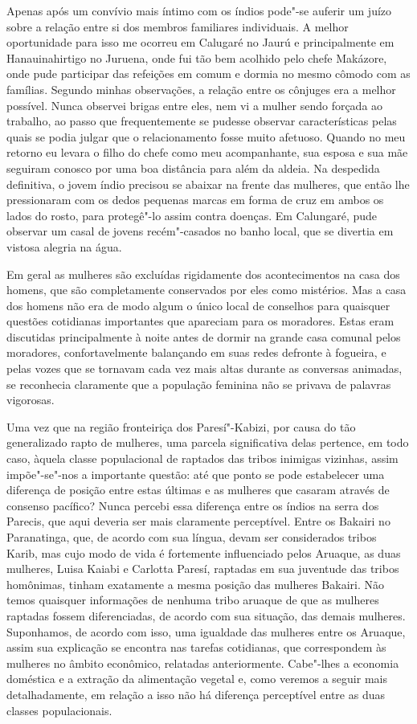 {Apenas após um convívio mais íntimo com os índios pode"-se auferir um
juízo sobre a relação entre si dos membros familiares individuais. A
melhor oportunidade para isso me ocorreu em Calugaré no Jaurú e
principalmente em Hanauinahirtigo no Juruena, onde fui tão bem acolhido
pelo chefe Makázore, onde pude participar das refeições em comum e
dormia no mesmo cômodo com as famílias. Segundo minhas observações, a
relação entre os cônjuges era a melhor possível. Nunca observei brigas
entre eles, nem vi a mulher sendo forçada ao trabalho, ao
passo que frequentemente se pudesse observar características pelas
quais se podia julgar que o relacionamento fosse muito afetuoso. Quando
no meu retorno eu levara o filho do chefe como meu acompanhante, sua
esposa e sua mãe seguiram conosco por uma boa distância para além da
aldeia. Na despedida definitiva, o jovem índio precisou se abaixar na
frente das mulheres, que então lhe pressionaram com os dedos pequenas
marcas em forma de cruz em ambos os lados do rosto, para protegê"-lo
assim contra doenças. Em Calungaré, pude observar um casal de jovens
recém"-casados no banho local, que se divertia em vistosa alegria na
água.}

Em geral as mulheres são excluídas rigidamente dos acontecimentos na
casa dos homens, que são completamente conservados por eles como
mistérios. Mas a casa dos homens não era de modo algum o único local de
conselhos para quaisquer questões cotidianas importantes que apareciam
para os moradores. Estas eram discutidas principalmente à noite antes de
dormir na grande casa comunal pelos moradores, confortavelmente
balançando em suas redes defronte à fogueira, e pelas vozes que se
tornavam cada vez mais altas durante as conversas animadas, se
reconhecia claramente que a população feminina não se privava de
palavras vigorosas.

Uma vez que na região fronteiriça dos Paresí"-Kabizi, por causa do tão
generalizado rapto de mulheres, uma parcela significativa delas
pertence, em todo caso, àquela classe populacional de raptados das
tribos inimigas vizinhas, assim impõe"-se"-nos a importante questão: até
que ponto se pode estabelecer uma diferença de posição entre estas
últimas e as mulheres que casaram através de consenso pacífico? Nunca
percebi essa diferença entre os índios na serra dos Parecis, que aqui
deveria ser mais claramente perceptível. Entre os Bakairi no
Paranatinga, que, de acordo com sua língua, devam ser considerados
tribos Karib, mas cujo modo de vida é fortemente influenciado pelos
Aruaque, as duas mulheres, Luisa Kaiabi e Carlotta Paresí, raptadas em
sua juventude das tribos homônimas, tinham exatamente a mesma posição
das mulheres Bakairi. Não temos quaisquer informações de nenhuma tribo
aruaque de que as mulheres raptadas fossem diferenciadas, de acordo com
sua situação, das demais mulheres. Suponhamos, de acordo com isso, uma
igualdade das mulheres entre os Aruaque, assim sua explicação se
encontra nas tarefas cotidianas, que correspondem às mulheres no âmbito
econômico, relatadas anteriormente. Cabe"-lhes a economia doméstica e a
extração da alimentação vegetal e, como veremos a seguir mais
detalhadamente, em relação a isso não há diferença perceptível entre as
duas classes populacionais.

